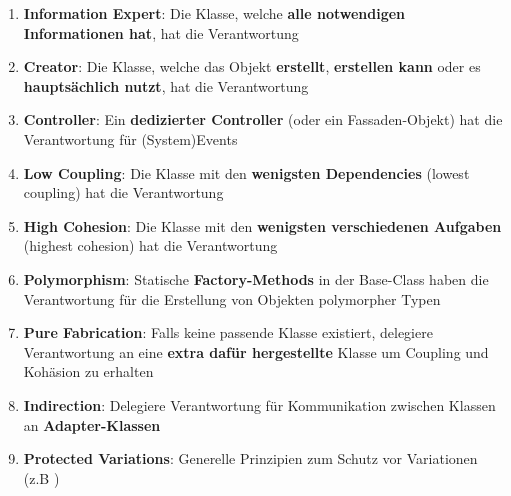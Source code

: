 \begin{enumerate}
	\item \textbf{Information Expert}: Die Klasse, welche \textbf{alle notwendigen Informationen hat}, hat die Verantwortung
	\item \textbf{Creator}: Die Klasse, welche das Objekt \textbf{erstellt}, \textbf{erstellen kann} oder es \textbf{hauptsächlich nutzt}, hat die Verantwortung
	\item \textbf{Controller}: Ein \textbf{dedizierter Controller} (oder ein Fassaden-Objekt) hat die Verantwortung für (System)Events
	\item \textbf{Low Coupling}: Die Klasse mit den \textbf{wenigsten Dependencies} (lowest coupling) hat die Verantwortung
	\item \textbf{High Cohesion}: Die Klasse mit den \textbf{wenigsten verschiedenen Aufgaben} (highest cohesion) hat die Verantwortung
	\item \textbf{Polymorphism}: Statische \textbf{Factory-Methods} in der Base-Class haben die Verantwortung für die Erstellung von Objekten polymorpher Typen
	\item \textbf{Pure Fabrication}: Falls keine passende Klasse existiert, delegiere Verantwortung an eine \textbf{extra dafür hergestellte} Klasse um Coupling und Kohäsion zu erhalten
	\item \textbf{Indirection}: Delegiere Verantwortung für Kommunikation zwischen Klassen an \textbf{Adapter-Klassen}
	\item \textbf{Protected Variations}: Generelle Prinzipien zum Schutz vor Variationen (z.B )
\end{enumerate}